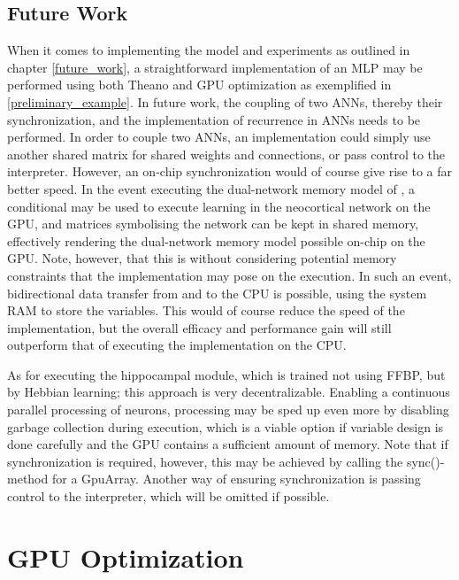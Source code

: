 \subsection{Future Work}

When it comes to implementing the model and experiments as outlined in chapter \ref{future_work}, a straightforward implementation of an MLP may be performed using both Theano and GPU optimization as exemplified in \ref{preliminary_example}. In future work, the coupling of two ANNs, thereby their synchronization, and the implementation of recurrence in ANNs needs to be performed. In order to couple two ANNs, an implementation could simply use another shared matrix for shared weights and connections, or pass control to the interpreter. However, an on-chip synchronization would of course give rise to a far better speed. In the event executing the dual-network memory model of \cite{Hattori2014}, a conditional may be used to execute learning in the neocortical network on the GPU, and matrices symbolising the network can be kept in shared memory, effectively rendering the dual-network memory model possible on-chip on the GPU. Note, however, that this is without considering potential memory constraints that the implementation may pose on the execution. In such an event, bidirectional data transfer from and to the CPU is possible, using the system RAM to store the variables. This would of course reduce the speed of the implementation, but the overall efficacy and performance gain will still outperform that of executing the implementation on the CPU.

As for executing the hippocampal module, which is trained not using FFBP, but by Hebbian learning; this approach is very decentralizable. Enabling a continuous parallel processing of neurons, processing may be sped up even more by disabling garbage collection during execution, which is a viable option if variable design is done carefully and the GPU contains a sufficient amount of memory. Note that if synchronization is required, however, this may be achieved by calling the sync()-method for a GpuArray. Another way of ensuring synchronization is passing control to the interpreter, which will be omitted if possible.


\section{GPU Optimization}

